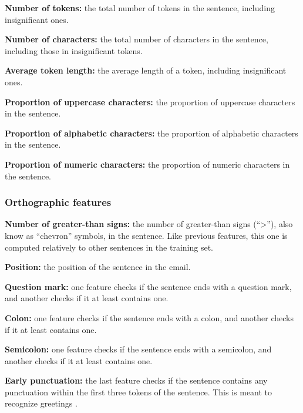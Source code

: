\textbf{Number of tokens:} the total number of tokens in the sentence, including insignificant ones.

\textbf{Number of characters:} the total number of characters in the sentence, including those in insignificant tokens.

\textbf{Average token length:} the average length of a token, including insignificant ones.

\textbf{Proportion of uppercase characters:} the proportion of uppercase characters in the sentence.

\textbf{Proportion of alphabetic characters:} the proportion of alphabetic characters in the sentence.

\textbf{Proportion of numeric characters:} the proportion of numeric characters in the sentence.

\subsubsection{Orthographic features}

\textbf{Number of greater-than signs:} the number of greater-than signs (``>''), also know as ``chevron'' symbols, in the sentence. Like previous features, this one is computed relatively to other sentences in the training set.

\textbf{Position:} the position of the sentence in the email.

\textbf{Question mark:} one feature checks if the sentence ends with a question mark, and another checks if it at least contains one.

\textbf{Colon:} one feature checks if the sentence ends with a colon, and another checks if it at least contains one.

\textbf{Semicolon:} one feature checks if the sentence ends with a semicolon, and another checks if it at least contains one.

\textbf{Early punctuation:} the last feature checks if the sentence contains any punctuation within the first three tokens of the sentence. This is meant to recognize greetings \cite{qadir2011classifying}.

